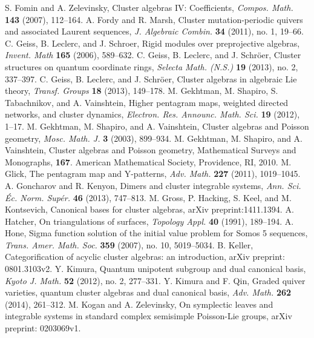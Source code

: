 \documentclass{amsart}
\theoremstyle{definition}
\theoremstyle{remark}
\numberwithin{equation}{section}
\begin{document}
\begin{thebibliography}{99}
	 S. Fomin and A. Zelevinsky, Cluster algebras IV: Coefficients, \textsl{Compos. Math.} \textbf{143} (2007), 112--164.
	 A. Fordy and R. Marsh, Cluster mutation-periodic quivers and associated Laurent sequences, \textsl{J. Algebraic Combin.} \textbf{34} (2011), no. 1, 19--66.
	 C. Geiss, B. Leclerc, and J. Schroer, Rigid modules over preprojective algebras, \textsl{Invent. Math} \textbf{165} (2006), 589--632.
   C. Geiss, B. Leclerc, and J. Schr\"oer, Cluster structures on quantum coordinate rings, \textsl{Selecta Math. (N.S.)} \textbf{19} (2013), no. 2, 337--397.
   C. Geiss, B. Leclerc, and J. Schr\"oer, Cluster algebras in algebraic Lie theory, \textsl{Transf. Groups} \textbf{18} (2013), 149--178.
	 M. Gekhtman, M. Shapiro, S. Tabachnikov, and A. Vainshtein, Higher pentagram maps, weighted directed networks, and cluster dynamics, \textsl{Electron. Res. Announc. Math. Sci.} \textbf{19} (2012), 1--17.
	 M. Gekhtman, M. Shapiro, and A. Vainshtein,  Cluster algebras and Poisson geometry, \textsl{Mosc. Math. J.} \textbf{3} (2003), 899--934.
   M. Gekhtman, M. Shapiro, and A. Vainshtein,  Cluster algebras and Poisson geometry, Mathematical Surveys and Monographs, \textbf{167}. American Mathematical Society, Providence, RI, 2010.
	 M. Glick, The pentagram map and Y-patterns, \textsl{Adv. Math.} \textbf{227} (2011), 1019--1045.
	 A. Goncharov and R. Kenyon, Dimers and cluster integrable systems, \textsl{Ann. Sci. \'Ec. Norm. Sup\'er.} \textbf{46} (2013), 747--813.
   M. Gross, P. Hacking, S. Keel, and M. Kontsevich, Canonical bases for cluster algebras, arXiv preprint:1411.1394.
	 A. Hatcher, On triangulations of surfaces, \textsl{Topology Appl.} \textbf{40} (1991), 189--194.
	 A. Hone, Sigma function solution of the initial value problem for Somos 5 sequences, \textsl{Trans. Amer. Math. Soc.} \textbf{359} (2007), no. 10, 5019--5034.
   B. Keller, Categorification of acyclic cluster algebras: an introduction, arXiv preprint: 0801.3103v2.
   Y. Kimura, Quantum unipotent subgroup and dual canonical basis, \textsl{Kyoto J. Math.} \textbf{52} (2012), no. 2, 277--331.
   Y. Kimura and F. Qin, Graded quiver varieties, quantum cluster algebras and dual canonical basis, \textsl{Adv. Math.} \textbf{262} (2014), 261--312.
   M. Kogan and A. Zelevinsky, On symplectic leaves and integrable systems in standard complex semisimple Poisson-Lie groups, arXiv preprint: 0203069v1.

\end{thebibliography}
\end{document}
